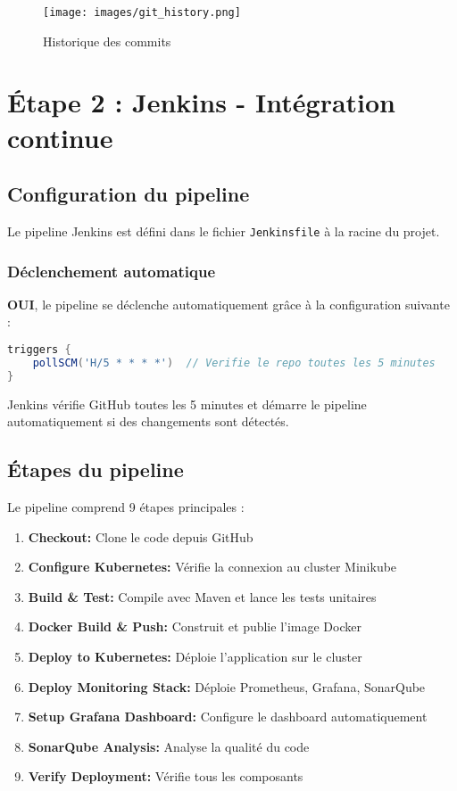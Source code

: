 \documentclass[12pt,a4paper]{article}
\begin{document}
\begin{figure}[H]
    \centering
    \texttt{[image: images/git\_history.png]}
    \caption{Historique des commits}
    \label{fig:git_history}
\end{figure}

\newpage

\section{Étape 2 : Jenkins - Intégration continue}

\subsection{Configuration du pipeline}
Le pipeline Jenkins est défini dans le fichier \texttt{Jenkinsfile} à la racine du projet.

\subsubsection{Déclenchement automatique}
\textbf{OUI}, le pipeline se déclenche automatiquement grâce à la configuration suivante :

\begin{lstlisting}[language=groovy]
triggers {
    pollSCM('H/5 * * * *')  // Verifie le repo toutes les 5 minutes
}
\end{lstlisting}

Jenkins vérifie GitHub toutes les 5 minutes et démarre le pipeline automatiquement si des changements sont détectés.

\subsection{Étapes du pipeline}

Le pipeline comprend 9 étapes principales :

\begin{enumerate}
    \item \textbf{Checkout:} Clone le code depuis GitHub
    \item \textbf{Configure Kubernetes:} Vérifie la connexion au cluster Minikube
    \item \textbf{Build \& Test:} Compile avec Maven et lance les tests unitaires
    \item \textbf{Docker Build \& Push:} Construit et publie l'image Docker
    \item \textbf{Deploy to Kubernetes:} Déploie l'application sur le cluster
    \item \textbf{Deploy Monitoring Stack:} Déploie Prometheus, Grafana, SonarQube
    \item \textbf{Setup Grafana Dashboard:} Configure le dashboard automatiquement
    \item \textbf{SonarQube Analysis:} Analyse la qualité du code
    \item \textbf{Verify Deployment:} Vérifie tous les composants
\end{enumerate}
\end{document}
